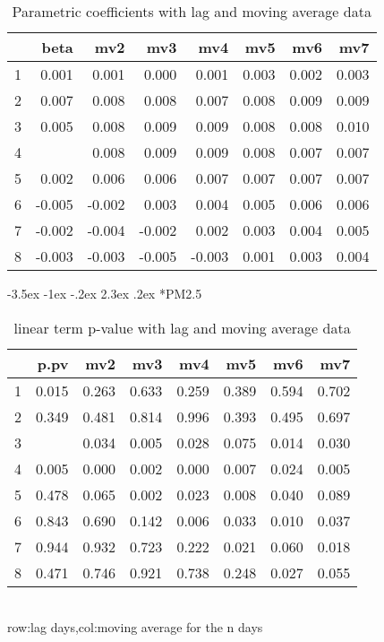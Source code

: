 \documentclass[a4paper, 12pt]{article}
\makeatletter
\def\large{\fontsize{14}{20}\selectfont}
\renewcommand\subsection{\@startsection {subsection}{1}{\z@}%
                                   {-3.5ex \@plus -1ex \@minus -.2ex}%
                                   {2.3ex \@plus.2ex}%
                                   {\centering\normalfont\large\bfseries}}
\makeatother
\begin{document}
\begin{table}[h]
\centering
\caption{Parametric coefficients with lag and moving average data}
\begin{tabular}{rrrrrrrr}
  \hline
 & beta & mv2 & mv3 & mv4 & mv5 & mv6 & mv7 \\
  \hline
1 & 0.001 & 0.001 & 0.000 & 0.001 & 0.003 & 0.002 & 0.003 \\
  2 & 0.007 & 0.008 & 0.008 & 0.007 & 0.008 & 0.009 & 0.009 \\
  3 & 0.005 & 0.008 & 0.009 & 0.009 & 0.008 & 0.008 & 0.010 \\
  4 & \color{red}{0.009} & 0.008 & 0.009 & 0.009 & 0.008 & 0.007 & 0.007 \\
  5 & 0.002 & 0.006 & 0.006 & 0.007 & 0.007 & 0.007 & 0.007 \\
  6 & -0.005 & -0.002 & 0.003 & 0.004 & 0.005 & 0.006 & 0.006 \\
  7 & -0.002 & -0.004 & -0.002 & 0.002 & 0.003 & 0.004 & 0.005 \\
  8 & -0.003 & -0.003 & -0.005 & -0.003 & 0.001 & 0.003 & 0.004 \\
   \hline
\end{tabular}
\end{table}
\clearpage
\subsection*{PM2.5}
\begin{table}[h]
\centering
\caption{linear term p-value with lag and moving average data}
\begin{tabular}{rrrrrrrr}
  \hline
 & p.pv & mv2 & mv3 & mv4 & mv5 & mv6 & mv7 \\
  \hline
1 & 0.015 & 0.263 & 0.633 & 0.259 & 0.389 & 0.594 & 0.702 \\
  2 & 0.349 & 0.481 & 0.814 & 0.996 & 0.393 & 0.495 & 0.697 \\
  3 & \color{red}{0.000} & 0.034 & 0.005 & 0.028 & 0.075 & 0.014 & 0.030 \\
  4 & 0.005 & 0.000 & 0.002 & 0.000 & 0.007 & 0.024 & 0.005 \\
  5 & 0.478 & 0.065 & 0.002 & 0.023 & 0.008 & 0.040 & 0.089 \\
  6 & 0.843 & 0.690 & 0.142 & 0.006 & 0.033 & 0.010 & 0.037 \\
  7 & 0.944 & 0.932 & 0.723 & 0.222 & 0.021 & 0.060 & 0.018 \\
  8 & 0.471 & 0.746 & 0.921 & 0.738 & 0.248 & 0.027 & 0.055 \\
   \hline
\end{tabular}
\\row:lag days,col:moving average for the n days
\end{table}
\end{document}
